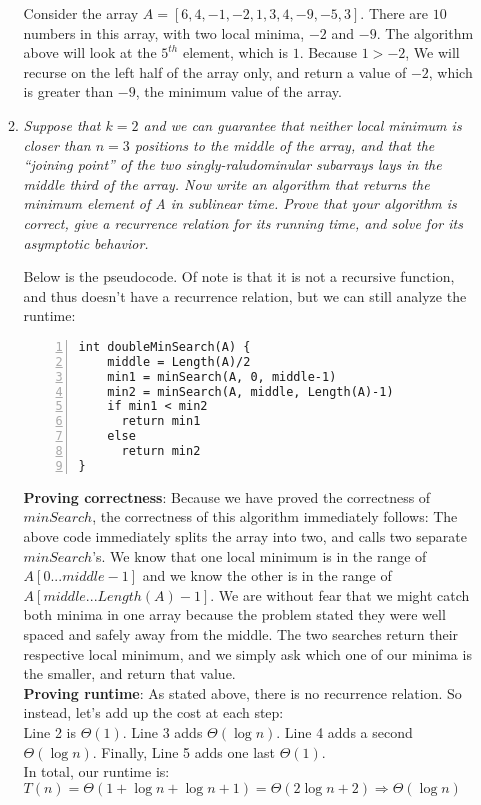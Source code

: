 \documentclass[12pt]{article}
\begin{document}
\begin{enumerate}
\begin{enumerate}
          Consider the array $A = [6, 4, -1, -2, 1, 3, 4, -9, -5, 3]$. There are $10$ numbers in this array, with two local minima, $-2$ and $-9$. The algorithm above will look at the $5^{th}$ element, which is $1$. Because $1 > -2$, We will recurse on the left half of the array only, and return a value of $-2$, which is greater than $-9$, the minimum value of the array.

          \item \textit{Suppose that $k = 2$ and we can guarantee that neither local minimum is closer than $n=3$ positions to the middle of the array, and that the ``joining point'' of the two singly-raludominular subarrays lays in the middle third of the array. Now write an algorithm that returns the minimum element of A in sublinear time. Prove that your algorithm is correct, give a recurrence relation for its running time, and solve for its asymptotic behavior.}

		Below is the pseudocode. Of note is that it is not a recursive function, and thus doesn't have a recurrence relation, but we can still analyze the runtime:

\pagebreak
          \begin{Verbatim}[numbers=left,xleftmargin=5mm]
int doubleMinSearch(A) {
    middle = Length(A)/2
    min1 = minSearch(A, 0, middle-1)
    min2 = minSearch(A, middle, Length(A)-1)
    if min1 < min2
      return min1
    else
      return min2
}
        \end{Verbatim}
	\textbf{Proving correctness}:
	Because we have proved the correctness of $minSearch$, the correctness of this algorithm immediately follows: The above code immediately splits the array into two, and calls two separate $minSearch$'s.   We know that one local minimum is in the range of $A[0 ... middle-1]$ and we know the other is in the range of $A[middle ... Length(A)-1]$. We are without fear that we might catch both minima in one array because the problem stated they were well spaced and safely away from the middle.  The two searches return their respective local minimum, and we simply ask which one of our minima is the smaller, and return that value.\\
	\textbf{Proving runtime}: As stated above, there is no recurrence relation. So instead, let's add up the cost at each step:\\
	
	Line 2 is $\Theta(1)$.
	Line 3 adds $\Theta(\log n)$.
	Line 4 adds a second $\Theta(\log n)$.
	Finally, Line 5 adds one last $\Theta(1)$.\\
	In total, our runtime is:\\
	 $T(n) = \Theta(1+\log n + \log n + 1) = \Theta(2\log n + 2) \Longrightarrow \boxed{\Theta(\log n)}$
	

\end{enumerate}
\end{enumerate}
\end{document}

